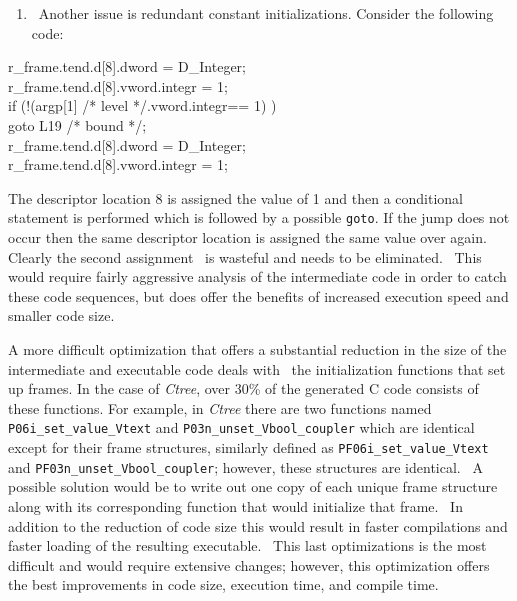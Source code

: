 \liststyleLxlii
\begin{enumerate}
\item 
\ Another issue is redundant constant initializations. Consider the following code:
\end{enumerate}
\goodbreak
\begin{iconcode}
r\_frame.tend.d[8].dword = D\_Integer;\\
r\_frame.tend.d[8].vword.integr = 1;\\
if (!(argp[1] /* level */.vword.integr== 1) )\\
\>goto L19 /* bound */;\\
r\_frame.tend.d[8].dword = D\_Integer;\\
r\_frame.tend.d[8].vword.integr = 1;\\
\end{iconcode}


The descriptor location 8 is assigned the value of 1 and then a conditional statement is performed which is followed by
a possible \texttt{goto}. If the jump does not occur then the same descriptor location is assigned the same value over
again. Clearly the second assignment \ is wasteful and needs to be eliminated. \ This would require fairly aggressive
analysis of the intermediate code in order to catch these code sequences, but does offer the benefits of increased
execution speed and smaller code size.


A more difficult optimization that offers a substantial reduction in the size of the intermediate and executable code
deals with \ the initialization functions that set up frames. In the case of \textit{Ctree}, over 30\% of the generated
C code consists of these functions. For example, in \textit{Ctree} there are two functions named
\texttt{P06i\_set\_value\_Vtext} and \texttt{P03n\_unset\_Vbool\_coupler} which are identical except for their frame
structures, similarly defined as \texttt{PF06i\_set\_value\_Vtext} and \texttt{PF03n\_unset\_Vbool\_coupler}; however,
these structures are identical. \ A possible solution would be to write out one copy of each unique frame structure
along with its corresponding function that would initialize that frame. \ In addition to the reduction of code size
this would result in faster compilations and faster loading of the resulting executable. \ This last optimizations is
the most difficult and would require extensive changes; however, this optimization offers the best improvements in code
size, execution time, and compile time.
